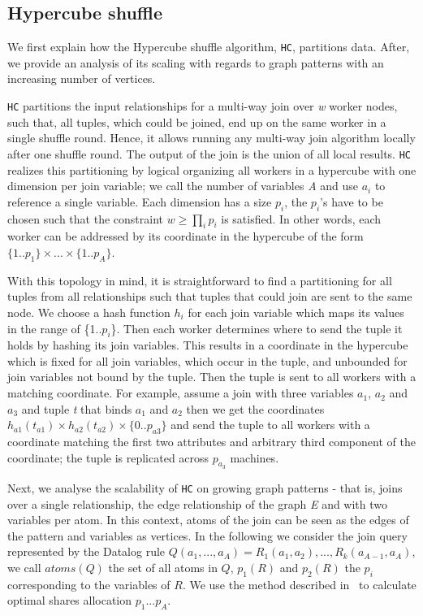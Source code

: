 \subsection{Hypercube shuffle}\label{ssec:hypercube-shuffle}
We first explain how the Hypercube shuffle algorithm, \texttt{HC}, partitions data.
After, we provide an analysis of its scaling with regards to graph patterns with an increasing number of vertices.

\texttt{HC} partitions the input relationships for a multi-way join over \textit{w} worker nodes, such that, all tuples, which could be joined, end up on the same worker in a single shuffle round.
Hence, it allows running any multi-way join algorithm locally after one shuffle round.
The output of the join is the union of all local results.
\texttt{HC} realizes this partitioning by logical organizing all workers in a hypercube with one dimension per join variable; we call the number of variables \textit{A} and use $a_i$ to reference a single variable.
Each dimension has a size $p_i$, the $p_i$'s have to be chosen such that the constraint $w \ge \prod_{i}p_i$ is satisfied.  %
In other words, each worker can be addressed by its coordinate in the hypercube of the form $\{1..p_1\} \times ... \times \{1..p_A\}$.

With this topology in mind, it is straightforward to find a partitioning for all tuples from all relationships such that tuples that could join are sent to the same node.
We choose a hash function $h_i$ for each join variable which maps its values in the range of \{1..$p_i$\}.
Then each worker determines where to send the tuple it holds by hashing its join variables.
This results in a coordinate in the hypercube which is fixed for all join variables, which occur in the tuple, and unbounded for join variables not bound by the tuple.
Then the tuple is sent to all workers with a matching coordinate.
For example, assume a join with three variables $a_1$, $a_2$ and $a_3$ and tuple \textit{t} that binds $a_1$ and $a_2$ then we get the coordinates $h_{a1}(t_{a1}) \times h_{a2}(t_{a2}) \times \{0..p_{a3}\}$ and send the tuple
to all workers with a coordinate matching the first two attributes and arbitrary third component of the coordinate; the tuple is replicated across $p_{a_3}$ machines. 

Next, we analyse the scalability of \texttt{HC} on growing graph patterns - that is, joins over a single relationship, the edge relationship of the graph \textit{E} and with two variables per atom.
In this context, atoms of the join can be seen as the edges of the pattern and variables as vertices.
In the following we consider the join query represented by the Datalog rule $Q(a_1, ..., a_A) = R_1(a_1, a_2), ..., R_k(a_{A-1}, a_A)$, we call $atoms(Q)$ the set of all atoms in $Q$, $p_1(R)$ and $p_2(R)$ the $p_i$ corresponding to the variables of $R$.
We use the method described in~\cite{myria-detailed} to calculate optimal shares allocation $p_1 ... p_A$.

